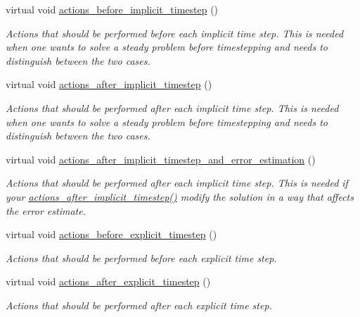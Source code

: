 \begin{DoxyCompactItemize}
virtual void \hyperlink{classoomph_1_1Problem_a4f19896906d2c0274ad6798cd3ac38dc}{actions\+\_\+before\+\_\+implicit\+\_\+timestep} ()
\begin{DoxyCompactList}\small\item\em Actions that should be performed before each implicit time step. This is needed when one wants to solve a steady problem before timestepping and needs to distinguish between the two cases. \end{DoxyCompactList}\item 
virtual void \hyperlink{classoomph_1_1Problem_a012692496c968960f4ea27db4e89cc7d}{actions\+\_\+after\+\_\+implicit\+\_\+timestep} ()
\begin{DoxyCompactList}\small\item\em Actions that should be performed after each implicit time step. This is needed when one wants to solve a steady problem before timestepping and needs to distinguish between the two cases. \end{DoxyCompactList}\item 
virtual void \hyperlink{classoomph_1_1Problem_a38d914a74e7998ddc74c205884d36d57}{actions\+\_\+after\+\_\+implicit\+\_\+timestep\+\_\+and\+\_\+error\+\_\+estimation} ()
\begin{DoxyCompactList}\small\item\em Actions that should be performed after each implicit time step. This is needed if your \hyperlink{classoomph_1_1Problem_a012692496c968960f4ea27db4e89cc7d}{actions\+\_\+after\+\_\+implicit\+\_\+timestep()} modify the solution in a way that affects the error estimate. \end{DoxyCompactList}\item 
virtual void \hyperlink{classoomph_1_1Problem_a6ae06bc0ecba349ebdf76220c1a17546}{actions\+\_\+before\+\_\+explicit\+\_\+timestep} ()
\begin{DoxyCompactList}\small\item\em Actions that should be performed before each explicit time step. \end{DoxyCompactList}\item 
virtual void \hyperlink{classoomph_1_1Problem_a51bfd872c45467a65ce977f3753a6d1d}{actions\+\_\+after\+\_\+explicit\+\_\+timestep} ()
\begin{DoxyCompactList}\small\item\em Actions that should be performed after each explicit time step. \end{DoxyCompactList}\item 

\end{DoxyCompactItemize}
